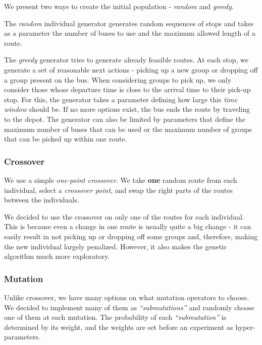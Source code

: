 We present two ways to create the initial population - \textit{random} and \textit{greedy}.

The \textit{random} individual generator generates random sequences of stops and takes as a parameter the number of buses to use and the maximum allowed length of a route.

The \textit{greedy} generator tries to generate already feasible routes. At each stop, we generate a set of reasonable next actions - picking up a new group or dropping off a group present on the bus. When considering groups to pick up, we only consider those whose departure time is close to the arrival time to their pick-up stop. For this, the generator takes a parameter defining how large this \textit{time window} should be. If no more options exist, the bus ends the route by traveling to the depot. The generator can also be limited by parameters that define the maximum number of buses that can be used or the maximum number of groups that can be picked up within one route.

\subsubsection{Crossover}

We use a simple \textit{one-point crossover}. We take \textbf{one} random route from each individual, select a \textit{crossover point}, and swap the right parts of the routes between the individuals.

We decided to use the crossover on only one of the routes for each individual. This is because even a change in one route is usually quite a big change - it can easily result in not picking up or dropping off some groups and, therefore, making the new individual largely penalized. However, it also makes the genetic algorithm much more exploratory.

\subsubsection{Mutation}

Unlike crossover, we have many options on what mutation operators to choose. We decided to implement many of them as \textit{``submutations''} and randomly choose one of them at each mutation. The probability of each \textit{``submutation''} is determined by its weight, and the weights are set before an experiment as hyper-parameters.

